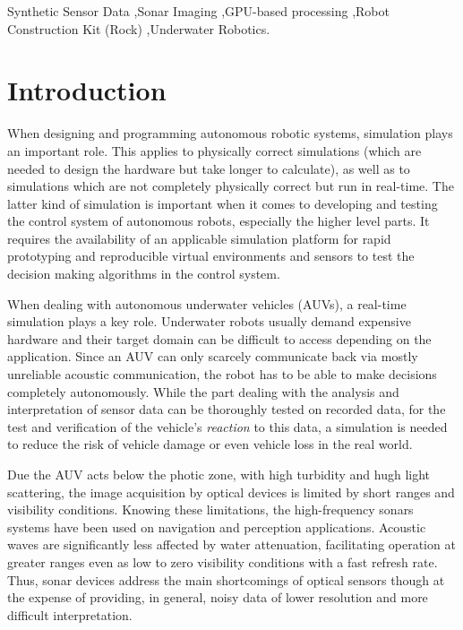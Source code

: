 \documentclass[final,5p,times]{elsarticle}
\begin{document}
\begin{frontmatter}
\begin{abstract}
\end{abstract}

\begin{keyword}
Synthetic Sensor Data \sep Sonar Imaging  \sep GPU-based processing \sep Robot Construction Kit (Rock) \sep Underwater Robotics.

\end{keyword}

\end{frontmatter}

\linenumbers

\section{Introduction}
\label{introduction}

When designing and programming autonomous robotic systems, simulation plays an important role. This applies to physically correct simulations (which are needed to design the hardware but take longer to calculate), as well as to simulations which are not completely physically correct but run in real-time. The latter kind of simulation is important when it comes to developing and testing the control system of autonomous robots, especially the higher level parts. It requires the availability of an applicable simulation platform for rapid prototyping and reproducible virtual environments and sensors to test the decision making algorithms in the control system.

When dealing with autonomous underwater vehicles (AUVs), a real-time simulation plays a key role. Underwater robots usually demand expensive hardware and their target domain can be difficult to access depending on the application. Since an AUV can only scarcely communicate back via mostly unreliable acoustic communication, the robot has to be able to make decisions completely autonomously. While the part dealing with the analysis and interpretation of sensor data can be thoroughly tested on recorded data, for the test and verification of the vehicle's \emph{reaction} to this data, a simulation is needed to reduce the risk of vehicle damage or even vehicle loss in the real world.

Due the AUV acts below the photic zone, with high turbidity and hugh light scattering, the image acquisition by optical devices is limited by short ranges and visibility conditions. Knowing these limitations, the high-frequency sonars systems have been used on navigation and perception applications. Acoustic waves are significantly less affected by water attenuation, facilitating operation at greater ranges even as low to zero visibility conditions with a fast refresh rate. Thus, sonar devices address the main shortcomings of optical sensors though at the expense of providing, in general, noisy data of lower resolution and more difficult interpretation.
\end{document}
